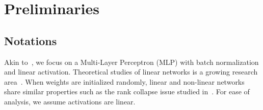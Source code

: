 

% 



\section{Preliminaries} \label{ortho:sec:perliminaries}
\subsection{Notations}
Akin to~\cite{daneshmand2020batch}, we focus on a Multi-Layer Perceptron (MLP) with batch normalization and linear activation. Theoretical studies of linear networks is a growing research area~\citep{saxe2013exact,daneshmand2020batch,bartlett2019gradient,arora2018convergence}.  When weights are initialized randomly, linear and non-linear networks share similar properties such as the rank collapse issue studied in~\citep{daneshmand2020batch}. For ease of analysis, we assume activations are linear. 

